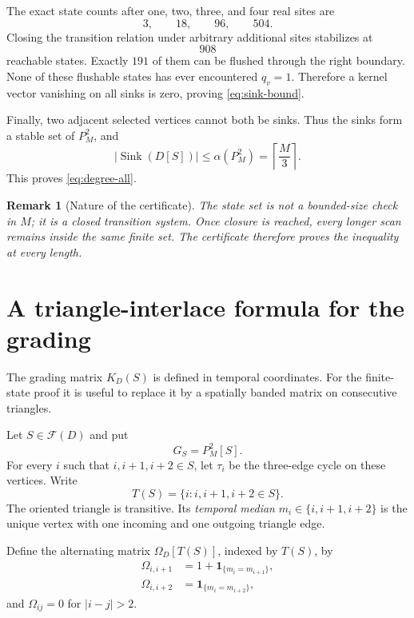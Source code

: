 \documentclass[10pt,letterpaper]{article}
\newtheorem{remark}[theorem]{Remark}
\newcommand{\Ffam}{\mathcal F}
\newcommand{\Sink}{\operatorname{Sink}}
\begin{document}
The exact state counts after one, two, three, and four real sites are
\[
 3,
 \qquad18,
 \qquad96,
 \qquad504.
\]
Closing the transition relation under arbitrary additional sites stabilizes at
\begin{equation}\label{eq:sink-states}
 908
\end{equation}
reachable states.  Exactly \(191\) of them can be flushed through the right boundary.  None of these flushable states has ever encountered \(q_v=1\).  Therefore a kernel vector vanishing on all sinks is zero, proving \eqref{eq:sink-bound}.

Finally, two adjacent selected vertices cannot both be sinks.  Thus the sinks form a stable set of \(P_M^2\), and
\[
 |\Sink(D[S])|\le\alpha(P_M^2)=\left\lceil\frac M3\right\rceil.
\]
This proves \eqref{eq:degree-all}.

\begin{remark}[Nature of the certificate]
The state set is not a bounded-size check in \(M\); it is a closed transition system.  Once closure is reached, every longer scan remains inside the same finite set.  The certificate therefore proves the inequality at every length.
\end{remark}

\section{A triangle-interlace formula for the grading}\label{sec:triangle}

The grading matrix \(K_D(S)\) is defined in temporal coordinates.  For the finite-state proof it is useful to replace it by a spatially banded matrix on consecutive triangles.

Let \(S\in\Ffam(D)\) and put
\[
 G_S=P_M^2[S].
\]
For every \(i\) such that \(i,i+1,i+2\in S\), let \(\tau_i\) be the three-edge cycle on these vertices.  Write
\begin{equation}\label{eq:Tset}
 T(S)=\{i:i,i+1,i+2\in S\}.
\end{equation}
The oriented triangle is transitive.  Its \emph{temporal median} \(m_i\in\{i,i+1,i+2\}\) is the unique vertex with one incoming and one outgoing triangle edge.

Define the alternating matrix \(\Omega_D[T(S)]\), indexed by \(T(S)\), by
\begin{align}
 \Omega_{i,i+1}&=1+\mathbf1_{\{m_i=m_{i+1}\}},\label{eq:Omega-near}\\
 \Omega_{i,i+2}&=\mathbf1_{\{m_i=m_{i+2}\}},\label{eq:Omega-next}
\end{align}
and \(\Omega_{ij}=0\) for \(|i-j|>2\).
\end{document}
